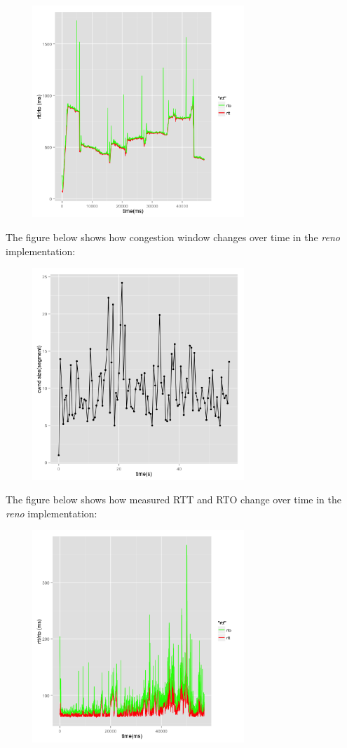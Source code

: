 \documentclass[10pt]{article}
\begin{document}
\begin{center}
  \includegraphics[width=10cm,height=8cm]{./rttrto_aimd.png}
\end{center}

The figure below shows how congestion window changes over time in the
\emph{reno} implementation:

\begin{center}
  \includegraphics[width=10cm,height=8cm]{./cwnd_reno.png}
\end{center}

The figure below shows how measured RTT and RTO change over time in
the \emph{reno} implementation:

\begin{center}
  \includegraphics[width=10cm,height=8cm]{./rttrto_reno.png}
\end{center}
\end{document}
